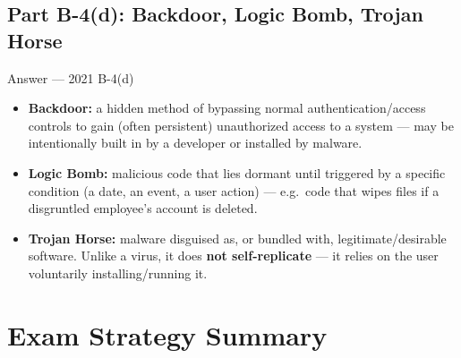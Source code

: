 \documentclass[12pt,a4paper]{article}
\begin{document}
\subsection{Part B-4(d): Backdoor, Logic Bomb, Trojan Horse}
\begin{solbox}{Answer --- 2021 B-4(d)}
\begin{itemize}[noitemsep]
  \item \textbf{Backdoor:} a hidden method of bypassing normal authentication/access controls to gain (often persistent) unauthorized access to a system --- may be intentionally built in by a developer or installed by malware.
  \item \textbf{Logic Bomb:} malicious code that lies dormant until triggered by a specific condition (a date, an event, a user action) --- e.g.\ code that wipes files if a disgruntled employee's account is deleted.
  \item \textbf{Trojan Horse:} malware disguised as, or bundled with, legitimate/desirable software. Unlike a virus, it does \textbf{not self-replicate} --- it relies on the user voluntarily installing/running it.
\end{itemize}
\end{solbox}

\newpage
\section*{Exam Strategy Summary}
\end{document}
